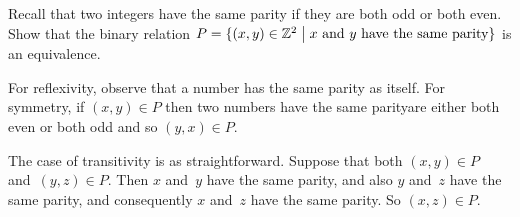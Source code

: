 \documentclass{ibl}  %
\begin{document}
\begin{problem}
\begin{exes}
\end{exes}
\end{problem}

\begin{problem}[\midlength]
Recall that two integers have the same parity if they are both odd or 
both even.
Show that the binary relation 
$P=\{(x,y)\in\mathbb{Z}^2 \bigm| \text{$x$ and $y$ have the same parity}\}$  
is an equivalence.
\begin{answer}
For reflexivity, observe that a number has the same parity as itself.
For symmetry, if $(x,y)\in P$ then
two numbers have the same parity\Dash are either both even or both odd\Dash
and so $(y,x)\in P$.

The case of transitivity is as straightforward.
Suppose that both $(x,y)\in P$ and~$(y,z)\in P$.
Then $x$ and~$y$ have the same parity, and also $y$ and~$z$ have the same
parity, and consequently $x$ and~$z$ have the same parity.
So $(x,z)\in P$.  
\end{answer}
\end{problem}
\end{document}
